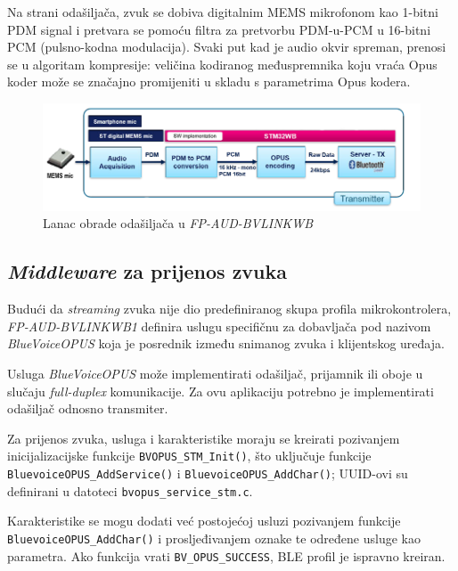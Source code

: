 Na strani odašiljača, zvuk se dobiva digitalnim MEMS mikrofonom kao 1-bitni PDM signal i pretvara se pomoću filtra za pretvorbu PDM-u-PCM u 16-bitni PCM (pulsno-kodna modulacija). Svaki put kad je audio okvir spreman, prenosi se u algoritam kompresije: veličina kodiranog međuspremnika koju vraća Opus koder može se značajno promijeniti u skladu s parametrima Opus kodera.

\begin{figure}[ht]
	\includegraphics[width=\linewidth]{imgs/duplex_chain}
	\caption{Lanac obrade odašiljača u \textit{FP-AUD-BVLINKWB} \cite{fpaudbvlink}}
	\label{fig:duplex_chain}
\end{figure}

\subsection{\textit{Middleware} za prijenos zvuka}

Budući da \textit{streaming} zvuka nije dio predefiniranog skupa profila mikrokontrolera, \textit{FP-AUD-BVLINKWB1} definira uslugu specifičnu za dobavljača pod nazivom \textit{BlueVoiceOPUS} koja je posrednik između snimanog zvuka i  klijentskog uređaja. 

Usluga \textit{BlueVoiceOPUS} može implementirati odašiljač, prijamnik ili oboje u slučaju \textit{full-duplex} komunikacije. Za ovu aplikaciju potrebno je implementirati odašiljač odnosno transmiter.

Za prijenos zvuka, usluga i karakteristike moraju se kreirati pozivanjem inicijalizacijske funkcije \lstinline|BVOPUS_STM_Init()|, što uključuje funkcije \newline \lstinline|BluevoiceOPUS_AddService()| i \lstinline|BluevoiceOPUS_AddChar()|; UUID-ovi su definirani u datoteci \lstinline|bvopus_service_stm.c|.

Karakteristike se mogu dodati već postojećoj usluzi pozivanjem funkcije \newline \lstinline|BluevoiceOPUS_AddChar()| i prosljeđivanjem oznake te određene usluge kao parametra. Ako funkcija vrati \lstinline|BV_OPUS_SUCCESS|, BLE profil je ispravno kreiran.

